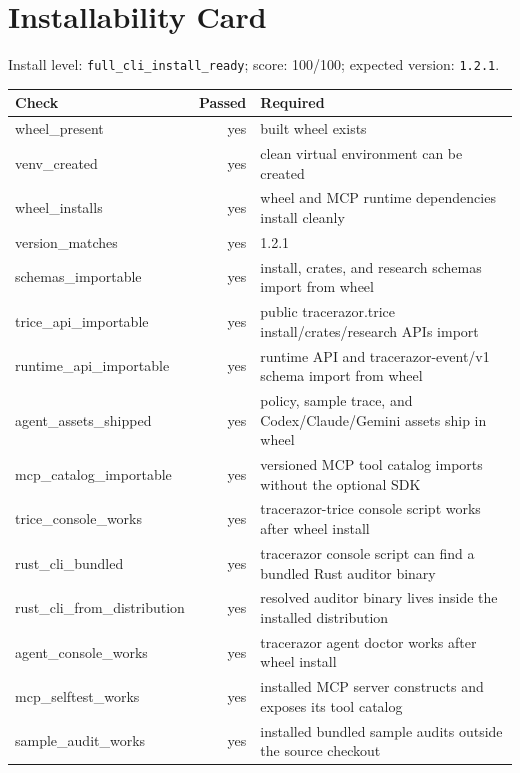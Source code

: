 \section{Installability Card}
Install level: \texttt{full\_cli\_install\_ready}; score: 100/100; expected version: \texttt{1.2.1}.

\begin{tabular}{lrl}
Check & Passed & Required \\
\hline
wheel\_present & yes & built wheel exists \\
venv\_created & yes & clean virtual environment can be created \\
wheel\_installs & yes & wheel and MCP runtime dependencies install cleanly \\
version\_matches & yes & 1.2.1 \\
schemas\_importable & yes & install, crates, and research schemas import from wheel \\
trice\_api\_importable & yes & public tracerazor.trice install/crates/research APIs import \\
runtime\_api\_importable & yes & runtime API and tracerazor-event/v1 schema import from wheel \\
agent\_assets\_shipped & yes & policy, sample trace, and Codex/Claude/Gemini assets ship in wheel \\
mcp\_catalog\_importable & yes & versioned MCP tool catalog imports without the optional SDK \\
trice\_console\_works & yes & tracerazor-trice console script works after wheel install \\
rust\_cli\_bundled & yes & tracerazor console script can find a bundled Rust auditor binary \\
rust\_cli\_from\_distribution & yes & resolved auditor binary lives inside the installed distribution \\
agent\_console\_works & yes & tracerazor agent doctor works after wheel install \\
mcp\_selftest\_works & yes & installed MCP server constructs and exposes its tool catalog \\
sample\_audit\_works & yes & installed bundled sample audits outside the source checkout \\
\end{tabular}

